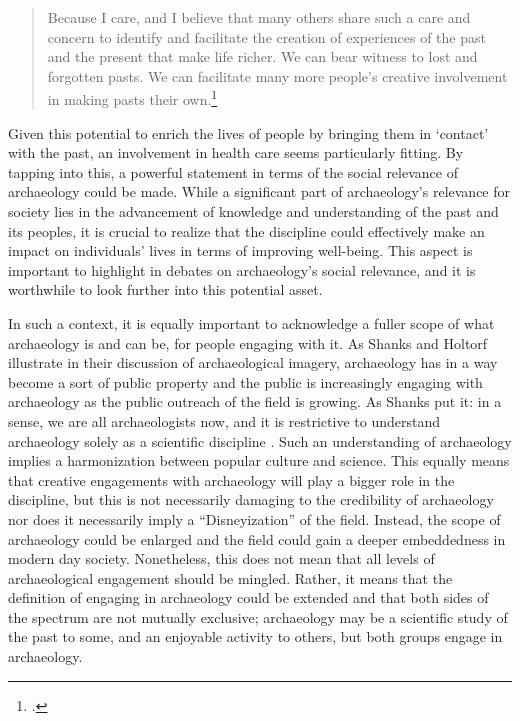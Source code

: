 \begin{quote}
Because I care, and I believe that many others share such a care and concern to identify and facilitate the creation of experiences of the past and the present that make life richer. We can bear witness to lost and forgotten pasts. We can facilitate many more people’s creative involvement in making pasts their own.\footnote{\cite[19]{Shanks_2012b}.}
	\end{quote}				
	Given this potential to enrich the lives of people by bringing them in ‘contact’ with the past, an involvement in health care seems particularly fitting. By tapping into this, a powerful statement in terms of the social relevance of archaeology could be made. While a significant part of archaeology’s relevance for society lies in the advancement of knowledge and understanding of the past and its peoples, it is crucial to realize that the discipline could effectively make an impact on individuals’ lives in terms of improving well-being. This aspect is important to highlight in debates on archaeology’s social relevance, and it is worthwhile to look further into this potential asset. 	
		
	In such a context, it is equally important to acknowledge a fuller scope of what archaeology is and can be, for people engaging with it. As Shanks and Holtorf illustrate in their discussion of archaeological imagery, archaeology has in a way become a sort of public property and the public is increasingly engaging with archaeology as the public outreach of the field is growing. As Shanks put it: in a sense, we are all archaeologists now, and it is restrictive to understand archaeology solely as a scientific discipline \parencite[41--42]{Shanks_2012a}. Such an understanding of archaeology implies a harmonization between popular culture and science. This equally means that creative engagements with archaeology will play a bigger role in the discipline, but this is not necessarily damaging to the credibility of archaeology nor does it necessarily imply a “Disneyization” \parencite[139,157]{Holtorf_2005} of the field. Instead, the scope of archaeology could be enlarged and the field could gain a deeper embeddedness in modern day society. Nonetheless, this does not mean that all levels of archaeological engagement should be mingled. Rather, it means that the definition of engaging in archaeology could be extended and that both sides of the spectrum are not mutually exclusive; archaeology may be a scientific study of the past to some, and an enjoyable activity to others, but both groups engage in archaeology.
	
